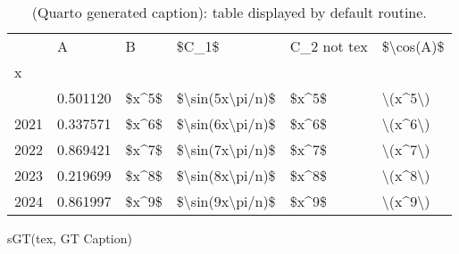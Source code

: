 \documentclass[
  11pt,
  a4paper,
  DIV=11,
  numbers=noendperiod]{scrartcl}
\newenvironment{Shaded}{\begin{snugshade}}{\end{snugshade}}
\newcommand{\NormalTok}[1]{\textcolor[rgb]{0.00,0.23,0.31}{#1}}
\newcommand{\StringTok}[1]{\textcolor[rgb]{0.13,0.47,0.30}{#1}}
\begin{document}
\begin{longtable}[]{@{}llllll@{}}

\caption{\label{tbl-tex}(Quarto generated caption): table displayed by
default routine.}

\tabularnewline

\toprule\noalign{}
& A & B & \$C\_1\$ & C\_2 not tex & \$\textbackslash cos(A)\$ \\
x & & & & & \\
\midrule\noalign{}
\endhead
\bottomrule\noalign{}
\endlastfoot
2020 & 0.501120 & \$x\^{}5\$ &
\$\textbackslash sin(5x\textbackslash pi/n)\$ & \$x\^{}5\$ &
\textbackslash(x\^{}5\textbackslash) \\
2021 & 0.337571 & \$x\^{}6\$ &
\$\textbackslash sin(6x\textbackslash pi/n)\$ & \$x\^{}6\$ &
\textbackslash(x\^{}6\textbackslash) \\
2022 & 0.869421 & \$x\^{}7\$ &
\$\textbackslash sin(7x\textbackslash pi/n)\$ & \$x\^{}7\$ &
\textbackslash(x\^{}7\textbackslash) \\
2023 & 0.219699 & \$x\^{}8\$ &
\$\textbackslash sin(8x\textbackslash pi/n)\$ & \$x\^{}8\$ &
\textbackslash(x\^{}8\textbackslash) \\
2024 & 0.861997 & \$x\^{}9\$ &
\$\textbackslash sin(9x\textbackslash pi/n)\$ & \$x\^{}9\$ &
\textbackslash(x\^{}9\textbackslash) \\

\end{longtable}

\begin{Shaded}
\begin{Highlighting}[]
\NormalTok{sGT(tex, }\StringTok{\textquotesingle{}GT Caption\textquotesingle{}}\NormalTok{)}
\end{Highlighting}
\end{Shaded}
\end{document}
